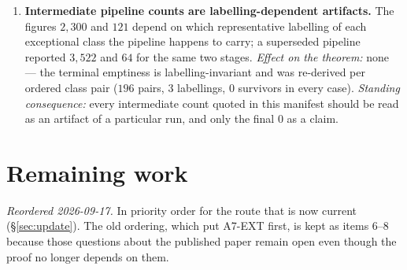 \documentclass[11pt,a4paper]{article}
\theoremstyle{plain}
\theoremstyle{definition}
\theoremstyle{remark}
\begin{document}
\begin{enumerate}[leftmargin=*]
    enumerated with no symmetry reduction and solved separately, $125$
    certificates, hash-bound to their formulas. \emph{Aggravating circumstance,
    recorded because it is the point of this section:} an earlier hostile review
    had checked the orbit structure for a $Q$-adjacency alone and endorsed the
    argument as sound. \emph{Superseded by:} \S\ref{sec:a7ext}.
  \item \textbf{Intermediate pipeline counts are labelling-dependent
    artifacts.} The figures $2{,}300$ and $121$ depend on which representative
    labelling of each exceptional class the pipeline happens to carry; a
    superseded pipeline reported $3{,}522$ and $64$ for the same two stages.
    \emph{Effect on the theorem:} none --- the terminal emptiness is
    labelling-invariant and was re-derived per ordered class pair
    ($196$ pairs, $3$ labellings, $0$ survivors in every case). \emph{Standing
    consequence:} every intermediate count quoted in this manifest should be
    read as an artifact of a particular run, and only the final $0$ as a claim.
\end{enumerate}

\section{Remaining work}\label{sec:remaining}

\emph{Reordered 2026-09-17.} In priority order for the route that is now
current (\S\ref{sec:update}). The old ordering, which put \textsf{A7-EXT} first,
is kept as items 6--8 because those questions about the published paper remain
open even though the proof no longer depends on them.
\end{document}

